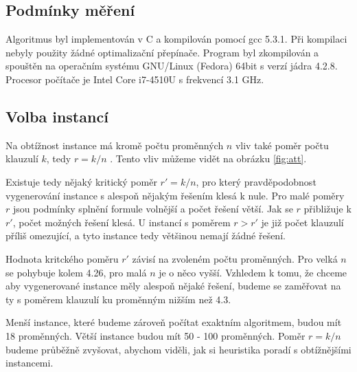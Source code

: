 \documentclass[11pt]{article}
\begin{document}
\subsection{Podmínky měření}

Algoritmus byl implementován v C a kompilován pomocí gcc 5.3.1. Při kompilaci nebyly použity žádné optimalizační přepínače. Program byl zkompilován a spouštěn na operačním systému GNU/Linux (Fedora) 64bit s verzí jádra 4.2.8. Procesor počítače je Intel Core i7-4510U s frekvencí 3.1 GHz.

\subsection{Volba instancí}

\label{sec:inst}

Na obtížnost instance má kromě počtu proměnných $n$ vliv také poměr počtu klauzulí $k$, tedy $r = k / n$ \cite{selman}. Tento vliv můžeme vidět na obrázku \ref{fig:att}. 

Existuje tedy nějaký kritický poměr $r' = k / n$, pro který pravděpodobnost vygenerování instance s alespoň nějakým řešením klesá k nule. Pro malé poměry $r$ jsou podmínky splnění formule volnější a počet řešení větší. Jak se $r$ přibližuje k $r'$, počet možných řešení klesá. U instancí s poměrem $r > r'$ je již počet klauzulí příliš omezující, a tyto instance tedy většinou nemají žádné řešení.\cite{satlib}

Hodnota kritckého poměru $r'$ závisí na zvoleném počtu proměnných. Pro velká $n$ se pohybuje kolem 4.26, pro malá $n$ je o něco vyšší\cite{satlib}. Vzhledem k tomu, že chceme aby vygenerované instance měly alespoň nějaké řešení, budeme se zaměřovat na ty s poměrem klauzulí ku proměnným nižším než 4.3.

Menší instance, které budeme zároveň počítat exaktním algoritmem, budou mít 18 proměnných. Větší instance budou mít 50 - 100 proměnných. Poměr $r = k / n$ budeme průběžně zvyšovat, abychom viděli, jak si heuristika poradí s obtížnějšími instancemi.   
\end{document}

